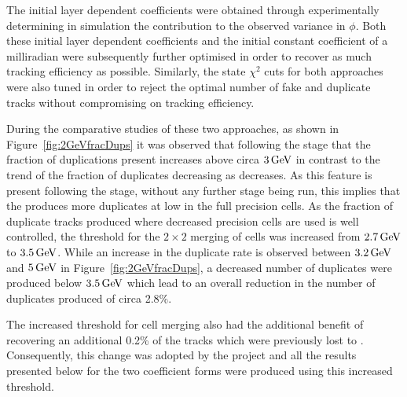 The initial layer dependent coefficients were obtained through experimentally determining in simulation the \MS  contribution to the observed variance in $\phi$.
Both these initial layer dependent coefficients and the initial constant coefficient of a milliradian were subsequently further optimised in order to recover as much tracking efficiency as  possible.
Similarly, the \KF state $\chi^{2}$ cuts for both approaches were also tuned in order to reject the optimal number of fake and duplicate tracks without compromising on tracking efficiency.

During the comparative studies of these two approaches, as shown in Figure~\ref{fig:2GeVfracDups} it was observed that following the \DR stage that the fraction of duplications present increases above circa $3\,\text{Ge\hspace{-.08em}V}$ in contrast to the trend of the fraction of duplicates decreasing as \pT decreases.
As this feature is present following the \HT stage, without any further stage being run, this implies that the \HT produces more duplicates at low \pT in the full precision cells.
As the fraction of duplicate tracks produced where decreased precision \HT cells are used is well controlled, the \pT threshold for the $2 \times 2$ merging of \HT cells was increased from $2.7\,\text{Ge\hspace{-.08em}V}$ to $3.5\,\text{Ge\hspace{-.08em}V}$.
While an increase in the duplicate rate is observed between $3.2\,\text{Ge\hspace{-.08em}V}$ and $5\,\text{Ge\hspace{-.08em}V}$ in Figure~\ref{fig:2GeVfracDups}, a decreased number of duplicates were produced below $3.5\,\text{Ge\hspace{-.08em}V}$ which lead to an overall reduction in the number of duplicates produced of circa 2.8\%.

The increased \pT threshold for \HT cell merging also had the additional benefit of recovering an additional 0.2\% of the tracks which were previously lost to \MS.
Consequently, this change was adopted by the project and all the results presented below for the two \MS coefficient forms were produced using this increased threshold. 

